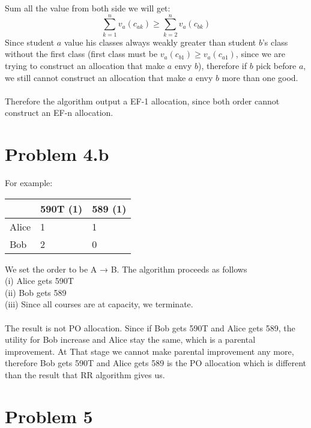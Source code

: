 \documentclass{article}
\begin{document}
Sum all the value from both side we will get:
$$\sum_{k = 1}^n v_a(c_{ak}) \geq \sum_{k = 2}^n v_a(c_{bk})$$
Since student $a$ value his classes always weakly greater than student $b$'s class without the first class (first class must be $v_a(c_{b1}) \geq v_a(c_{a1})$, since we are trying to construct an allocation that make $a$ envy $b$), therefore if $b$ pick before $a$, we still cannot construct an allocation that make $a$ envy $b$ more than one good.\\\\
Therefore the algorithm output a EF-1 allocation, since both order cannot construct an EF-n allocation.
\newpage
\section{Problem 4.b}
For example:\\
\begin{center}
\begin{tabular}{ | m{4em} | m{4em}| m{4em} | } 
  \hline
   & 590T (1) & 589 (1) \\ 
  \hline
  Alice & 1 & 1 \\ 
  \hline
  Bob & 2 & 0 \\ 
  \hline
\end{tabular}
\end{center}
We set the order to be A → B. The algorithm proceeds as follows\\
(i) Alice gets 590T\\
(ii) Bob gets 589\\
(iii) Since all courses are at capacity, we terminate.\\\\
The result is not PO allocation. Since if Bob gets 590T and Alice gets 589, the utility for Bob increase and Alice stay the same, which is a parental improvement. At That stage we cannot make parental improvement any more, therefore Bob gets 590T and Alice gets 589 is the PO allocation which is different than the result that RR algorithm gives us.

\newpage
\section{Problem 5}



\end{document}
